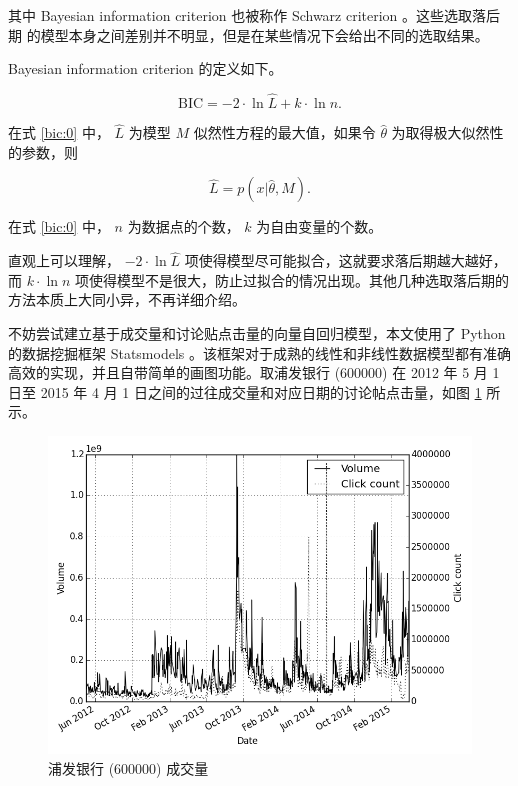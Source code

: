 其中 Bayesian information criterion 也被称作 Schwarz criterion 。这些选取落后期
的模型本身之间差别并不明显，但是在某些情况下会给出不同的选取结果。

Bayesian information criterion 的定义如下。

\begin{equation}
  \label{bic:0}
  \text{BIC}=-2\cdot \ln \hat{L}+k\cdot \ln n.
\end{equation}

在式 \ref{bic:0} 中， $\hat{L}$ 为模型 $M$ 似然性方程的最大值，如果令 $\hat{\theta}$ 为取得极大似然性的参数，则

\begin{equation}
  \label{bic:1}
  \hat{L}=p(x|\hat{\theta},M).
\end{equation}

在式 \ref{bic:0} 中， $n$ 为数据点的个数， $k$ 为自由变量的个数。

直观上可以理解， $-2\cdot \ln \hat{L}$ 项使得模型尽可能拟合，这就要求落后期越大越好，而 $k\cdot \ln n$ 项使得模型不是很大，防止过拟合的情况出现。其他几种选取落后期的方法本质上大同小异，不再详细介绍。

不妨尝试建立基于成交量和讨论贴点击量的向量自回归模型，本文使用了 Python 的数据挖掘框架 Statsmodels\cite{statsmodels} 。该框架对于成熟的线性和非线性数据模型都有准确高效的实现，并且自带简单的画图功能。取浦发银行 (600000) 在 2012 年 5 月 1 日至 2015 年 4 月 1  日之间的过往成交量和对应日期的讨论帖点击量，如图 \ref{auto_regression:0} 所示。

\begin{figure}
  \centering
  \includegraphics[width=\textwidth]{plots/auto_regression_0.png}
  \caption{浦发银行 (600000) 成交量}
  \label{auto_regression:0}
\end{figure}

